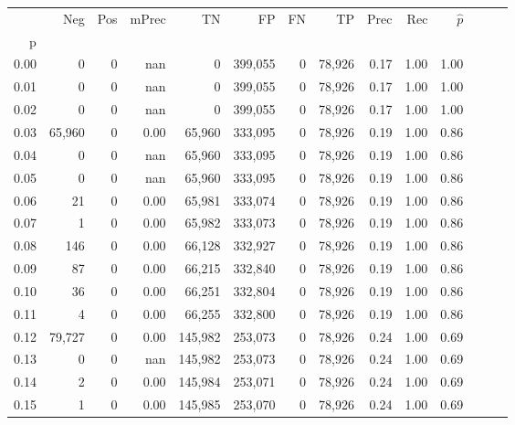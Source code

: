 \begin{tabular}{rrrrrrrrrrrrrr}
\toprule
{} &     Neg &     Pos & mPrec &       TN &       FP &      FN &      TP &  Prec &   Rec & $\hat{p}$ \\
p    &         &         &       &          &          &         &         &       &       &           \\
\midrule
0.00 &       0 &       0 &   nan &        0 &  399,055 &       0 &  78,926 &  0.17 &  1.00 &      1.00 \\
0.01 &       0 &       0 &   nan &        0 &  399,055 &       0 &  78,926 &  0.17 &  1.00 &      1.00 \\
0.02 &       0 &       0 &   nan &        0 &  399,055 &       0 &  78,926 &  0.17 &  1.00 &      1.00 \\
0.03 &  65,960 &       0 &  0.00 &   65,960 &  333,095 &       0 &  78,926 &  0.19 &  1.00 &      0.86 \\
0.04 &       0 &       0 &   nan &   65,960 &  333,095 &       0 &  78,926 &  0.19 &  1.00 &      0.86 \\
0.05 &       0 &       0 &   nan &   65,960 &  333,095 &       0 &  78,926 &  0.19 &  1.00 &      0.86 \\
0.06 &      21 &       0 &  0.00 &   65,981 &  333,074 &       0 &  78,926 &  0.19 &  1.00 &      0.86 \\
0.07 &       1 &       0 &  0.00 &   65,982 &  333,073 &       0 &  78,926 &  0.19 &  1.00 &      0.86 \\
0.08 &     146 &       0 &  0.00 &   66,128 &  332,927 &       0 &  78,926 &  0.19 &  1.00 &      0.86 \\
0.09 &      87 &       0 &  0.00 &   66,215 &  332,840 &       0 &  78,926 &  0.19 &  1.00 &      0.86 \\
0.10 &      36 &       0 &  0.00 &   66,251 &  332,804 &       0 &  78,926 &  0.19 &  1.00 &      0.86 \\
0.11 &       4 &       0 &  0.00 &   66,255 &  332,800 &       0 &  78,926 &  0.19 &  1.00 &      0.86 \\
0.12 &  79,727 &       0 &  0.00 &  145,982 &  253,073 &       0 &  78,926 &  0.24 &  1.00 &      0.69 \\
0.13 &       0 &       0 &   nan &  145,982 &  253,073 &       0 &  78,926 &  0.24 &  1.00 &      0.69 \\
0.14 &       2 &       0 &  0.00 &  145,984 &  253,071 &       0 &  78,926 &  0.24 &  1.00 &      0.69 \\
0.15 &       1 &       0 &  0.00 &  145,985 &  253,070 &       0 &  78,926 &  0.24 &  1.00 &      0.69 \\

\end{tabular}
